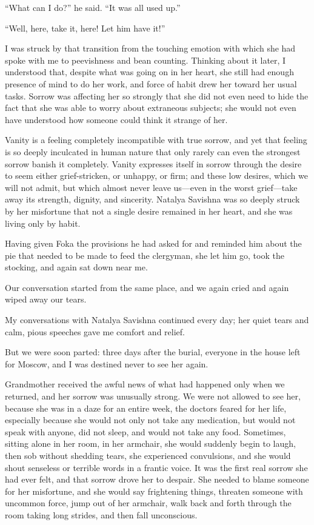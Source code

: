 ``What can I do?'' he said. ``It was all used up.'' %

``Well, here, take it, here! Let him have it!'' %

I was struck by that transition from the touching emotion with which she had spoke with me to peevishness and bean counting. Thinking about it later, I understood that, despite what was going on in her heart, she still had enough presence of mind to do her work, and force of habit drew her toward her usual tasks. Sorrow was affecting her so strongly that she did not even need to hide the fact that she was able to worry about extraneous subjects; she would not even have understood how someone could think it strange of her.

Vanity is a feeling completely incompatible with true sorrow, and yet that feeling is so deeply inculcated in human nature that only rarely can even the strongest sorrow banish it completely. Vanity expresses itself in sorrow through the desire to seem either grief-stricken, or unhappy, or firm; and these low desires, which we will not admit, but which almost never leave us---even in the worst grief---take away its strength, dignity, and sincerity. Natalya Savishna was so deeply struck by her misfortune that not a single desire remained in her heart, and she was living only by habit.

Having given Foka the provisions he had asked for and reminded him about the pie that needed to be made to feed the clergyman, she let him go, took the stocking, and again sat down near me.

Our conversation started from the same place, and we again cried and again wiped away our tears.

My conversations with Natalya Savishna continued every day; her quiet tears and calm, pious speeches gave me comfort and relief.

But we were soon parted: three days after the burial, everyone in the house left for Moscow, and I was destined never to see her again.

Grandmother received the awful news of what had happened only when we returned, and her sorrow was unusually strong. We were not allowed to see her, because she was in a daze for an entire week, the doctors feared for her life, especially because she would not only not take any medication, but would not speak with anyone, did not sleep, and would not take any food. Sometimes, sitting alone in her room, in her armchair, she would suddenly begin to laugh, then sob without shedding tears, she experienced convulsions, and she would shout senseless or terrible words in a frantic voice. It was the first real sorrow she had ever felt, and that sorrow drove her to despair. She needed to blame someone for her misfortune, and she would say frightening things, threaten someone with uncommon force, jump out of her armchair, walk back and forth through the room taking long strides, and then fall unconscious.

